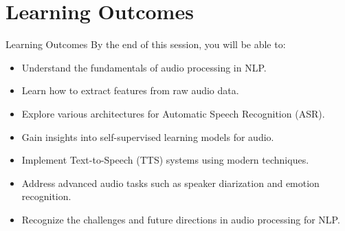 \section{Learning Outcomes}

\begin{frame}{Learning Outcomes}
    By the end of this session, you will be able to:
    \begin{itemize}
        \setlength{\itemsep}{0.8em}
        \item Understand the fundamentals of audio processing in NLP.
        \item Learn how to extract features from raw audio data.
        \item Explore various architectures for Automatic Speech Recognition (ASR).
        \item Gain insights into self-supervised learning models for audio.
        \item Implement Text-to-Speech (TTS) systems using modern techniques.
        \item Address advanced audio tasks such as speaker diarization and emotion recognition.
        \item Recognize the challenges and future directions in audio processing for NLP.
    \end{itemize}
\end{frame}
